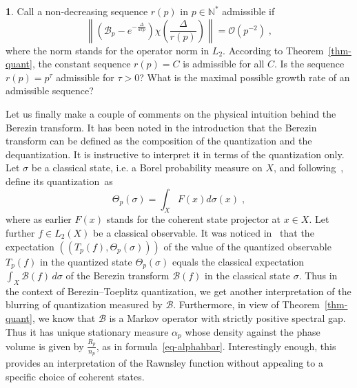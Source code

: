 \documentclass[11pt]{article}
\theoremstyle{definition}
\newcommand{\enoncename}{}
\newtheorem{corpusenonce}[theo]{\enoncename}
\newenvironment{enonce}[1]{\renewcommand{\enoncename}{#1}\begin{corpusenonce}}{\end{corpusenonce}}
\numberwithin{equation}{section}
\numberwithin{figure}{section}
\numberwithin{table}{section}
\newcommand{\N}{{\mathbb{N}}}
\newcommand{\cB}{{\mathcal{B}}}
\newcommand{\bigo}{\mathcal{O}}
\newcommand\< {\mathcal{h}}
\renewcommand\> {\mathcal{i}}
\begin{document}
\begin{enonce}
{Problem}\label{prob}
Call a non-decreasing sequence $r(p)$
in $p \in \N^*$ \textup{admissible} if
\[
\left\|(\cB_p-e^{-\frac{\Delta}{4\pi p}}) \chi\left(\frac{\Delta}{r(p)}\right)\right\| = \bigo\left(p^{-2}\right)\;,
\]
where the norm stands for the operator norm in $L_2$. According to Theorem~\ref{thm-quant}, the constant sequence $r(p) = C$ is admissible for all $C$. Is the sequence $r(p) = p^\tau$ admissible for $\tau >0$? What is the maximal possible growth rate of an admissible sequence?
\end{enonce}



Let us finally make a couple of comments on the physical intuition behind the Berezin transform. It has been noted in the introduction that the Berezin transform can be defined as the composition of the quantization and the dequantization. It is instructive to interpret it in terms of the quantization only. Let $\sigma$ be a classical state, i.e. a Borel probability measure on $X$, and following~\cite{CP1}, define its quantization~as
\[
\Theta_p(\sigma) = \int_X F(x)d\sigma(x)\;,
\]
where as earlier $F(x)$ stands for the coherent state projector at $x\in X$. Let further $f \in L_2(X)$ be a classical observable. It was noticed in~\cite[(11)]{CP1} that the expectation $((T_p(f),\Theta_p(\sigma)))$ of the value of the quantized observable $T_p(f)$ in the quantized state $\Theta_p(\sigma)$ equals the classical expectation $\int_X \cB(f)\,d\sigma$ of the Berezin transform $\cB(f)$ in the classical state $\sigma$. Thus in the context of Berezin--Toeplitz quantization, we get another interpretation of the blurring of quantization measured by $\cB$. Furthermore, in view of Theorem~\ref{thm-quant}, we know that $\cB$ is a Markov operator with strictly positive spectral gap. Thus it has unique stationary measure $\alpha_p$ whose density against the phase volume is given by $\frac{R_p}{n_p}$, as in formula~\eqref{eq-alphahbar}. Interestingly enough, this provides an interpretation of the Rawnsley function without appealing to a specific choice of coherent states.
\end{document}
